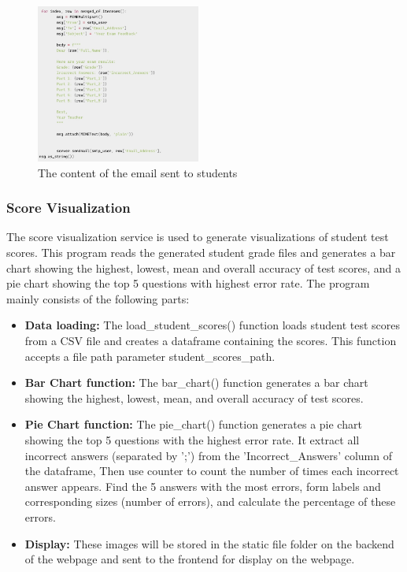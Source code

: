 \documentclass[twocolumn]{article}
\begin{document}
        \begin{figure}[ht]
            \centering
            \includegraphics[width=0.48\textwidth]{email_content.png}
            \caption{The content of the email sent to students}
            \label{fig:email_content}
        \end{figure}

        \subsubsection{Score Visualization}
        The score visualization service is used to generate visualizations of student test scores. This program reads the generated student grade files and generates a bar chart showing the highest, lowest, mean and overall accuracy of test scores, and a pie chart showing the top 5 questions with highest error rate. The program mainly consists of the following parts:

        \begin{itemize}
            \item \textbf{Data loading:} The load\_student\_scores() function loads student test scores from a CSV file and creates a dataframe containing the scores. This function accepts a file path parameter student\_scores\_path.
            \item \textbf{Bar Chart function:} The bar\_chart() function generates a bar chart showing the highest, lowest, mean, and overall accuracy of test scores. 
            \item \textbf{Pie Chart function:} The pie\_chart() function generates a pie chart showing the top 5 questions with the highest error rate. It extract all incorrect answers (separated by ';') from the 'Incorrect\_Answers' column of the dataframe, Then use counter to count the number of times each incorrect answer appears. Find the 5 answers with the most errors, form labels and corresponding sizes (number of errors), and calculate the percentage of these errors.
            \item \textbf{Display:} These images will be stored in the static file folder on the backend of the webpage and sent to the frontend for display on the webpage.
        \end{itemize}
\end{document}
